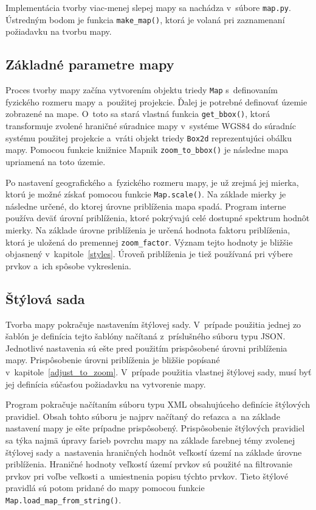 Implementácia tvorby viac-menej slepej mapy sa nachádza v~súbore {\tt map.py}. Ústredným bodom je funkcia {\tt make\_map()}, ktorá je volaná pri zaznamenaní požiadavku na tvorbu mapy.

\subsection*{Základné parametre mapy}
Proces tvorby mapy začína vytvorením objektu triedy {\tt Map} s~definovaním fyzického rozmeru mapy a~použitej projekcie. Ďalej je potrebné definovať územie zobrazené na mape. O~toto sa stará vlastná funkcia {\tt get\_bbox()}, ktorá transformuje zvolené hraničné súradnice mapy v~systéme WGS84 do súradníc systému použitej projekcie a~vráti objekt triedy {\tt Box2d} reprezentujúci obálku mapy. Pomocou funkcie knižnice Mapnik {\tt zoom\_to\_bbox()} je následne mapa upriamená na toto územie.

Po nastavení geografického a~fyzického rozmeru mapy, je už zrejmá jej mierka, ktorú je možné získať pomocou funkcie {\tt Map.scale()}. Na základe mierky je následne určené, do ktorej úrovne priblíženia mapa spadá. Program interne používa deväť úrovní priblíženia, ktoré pokrývajú celé dostupné spektrum hodnôt mierky. Na základe úrovne priblíženia je určená hodnota faktoru priblíženia, ktorá je uložená do premennej {\tt zoom\_factor}. Význam tejto hodnoty je bližšie objasnený v~kapitole~\ref{styles}. Úroveň priblíženia je tiež používaná pri výbere prvkov a~ich spôsobe vykreslenia.

\subsection*{Štýlová sada}
Tvorba mapy pokračuje nastavením štýlovej sady. V~prípade použitia jednej zo šablón je definícia tejto šablóny načítaná z~príslušného súboru typu JSON. Jednotlivé nastavenia sú ešte pred použitím prispôsobené úrovni priblíženia mapy. Prispôsobenie úrovni priblíženia je bližšie popísané v~kapitole~\ref{adjust_to_zoom}. V~prípade použitia vlastnej štýlovej sady, musí byť jej definícia súčasťou požiadavku na vytvorenie mapy.

Program pokračuje načítaním súboru typu XML obsahujúceho definície štýlových pravidiel. Obsah tohto súboru je najprv načítaný do reťazca a~na základe nastavení mapy je ešte prípadne prispôsobený. Prispôsobenie štýlových pravidiel sa týka najmä úpravy farieb povrchu mapy na základe farebnej témy zvolenej štýlovej sady a~nastavenia hraničných hodnôt veľkostí území na základe úrovne priblíženia. Hraničné hodnoty veľkostí území prvkov sú použité na filtrovanie prvkov pri voľbe veľkosti a~umiestnenia popisu týchto prvkov. Tieto štýlové pravidlá sú potom pridané do mapy pomocou funkcie {\tt Map.load\_map\_from\_string()}.

